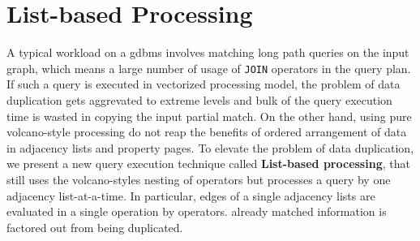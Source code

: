 \section{List-based Processing}
\label{sec:list-based-proc}

A typical workload on a \gls{gdbms} involves matching long path queries on the input graph, which means a large number of usage of \texttt{JOIN} operators in the query plan. If such a query is executed in vectorized processing model, the problem of data duplication gets aggrevated to extreme levels and bulk of the query execution time is wasted in copying the input partial match. On the other hand, using pure volcano-style processing do not reap the benefits of ordered arrangement of data in adjacency lists and property pages. To elevate the problem of data duplication, we present a new query execution technique called \textbf{List-based processing}, that still uses the volcano-styles nesting of operators but processes a query by one adjacency list-at-a-time. In particular, edges of a single adjacency lists are evaluated in a single operation by operators. already matched information is factored out from being duplicated. 

















